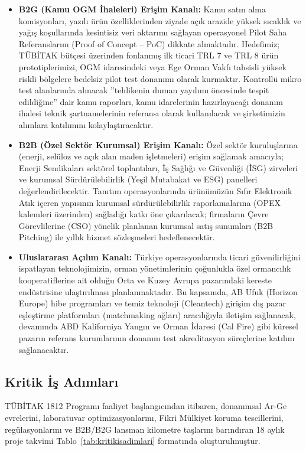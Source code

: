 \documentclass[11pt,a4paper]{article}
\begin{document}
\begin{itemize}[leftmargin=1cm]
  \item \textbf{B2G (Kamu OGM İhaleleri) Erişim Kanalı:} Kamu satın alma komisyonları, yazılı ürün özelliklerinden ziyade açık arazide yüksek sıcaklık ve yağış koşullarında kesintisiz veri aktarımı sağlayan operasyonel Pilot Saha Referanslarını (Proof of Concept -- PoC) dikkate almaktadır. Hedefimiz; TÜBİTAK bütçesi üzerinden fonlanmış ilk ticari TRL 7 ve TRL 8 ürün prototiplerimizi, OGM idaresindeki veya Ege Orman Vakfı tahsisli yüksek riskli bölgelere bedelsiz pilot test donanımı olarak kurmaktır. Kontrollü mikro test alanlarında alınacak ''tehlikenin duman yayılımı öncesinde tespit edildiğine'' dair kamu raporları, kamu idarelerinin hazırlayacağı donanım ihalesi teknik şartnamelerinin referansı olarak kullanılacak ve şirketimizin alımlara katılımını kolaylaştıracaktır.
  \item \textbf{B2B (Özel Sektör Kurumsal) Erişim Kanalı:} Özel sektör kuruluşlarına (enerji, selüloz ve açık alan maden işletmeleri) erişim sağlamak amacıyla; Enerji Sendikaları sektörel toplantıları, İş Sağlığı ve Güvenliği (İSG) zirveleri ve kurumsal Sürdürülebilirlik (Yeşil Mutabakat ve ESG) panelleri değerlendirilecektir. Tanıtım operasyonlarında ürünümüzün Sıfır Elektronik Atık içeren yapısının kurumsal sürdürülebilirlik raporlamalarına (OPEX kalemleri üzerinden) sağladığı katkı öne çıkarılacak; firmaların Çevre Görevlilerine (CSO) yönelik planlanan kurumsal satış sunumları (B2B Pitching) ile yıllık hizmet sözleşmeleri hedeflenecektir.
  \item \textbf{Uluslararası Açılım Kanalı:} Türkiye operasyonlarında ticari güvenilirliğini ispatlayan teknolojimizin, orman yönetimlerinin çoğunlukla özel ormancılık kooperatiflerine ait olduğu Orta ve Kuzey Avrupa pazarındaki kereste endüstrisine ulaştırılması planlanmaktadır. Bu kapsamda, AB Ufuk (Horizon Europe) hibe programları ve temiz teknoloji (Cleantech) girişim dış pazar eşleştirme platformları (matchmaking ağları) aracılığıyla iletişim sağlanacak, devamında ABD Kaliforniya Yangın ve Orman İdaresi (Cal Fire) gibi küresel pazarın referans kurumlarının donanım test akreditasyon süreçlerine katılım sağlanacaktır.
\end{itemize}

\subsection{Kritik İş Adımları}

TÜBİTAK 1812 Programı faaliyet başlangıcından itibaren, donanımsal Ar-Ge evrelerini, laboratuvar optimizasyonlarını, Fikri Mülkiyet koruma tescillerini, regülasyonlarını ve B2B/B2G lansman kilometre taşlarını barındıran 18 aylık proje takvimi Tablo~\ref{tab:kritikisadimlari} formatında oluşturulmuştur.
\end{document}
